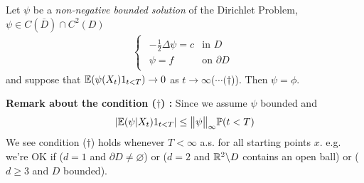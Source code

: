 \documentclass[12pt,a4paper]{report}
\begin{document}
 Let $\psi$ be a \emph{non-negative bounded solution} of the Dirichlet Problem, $\psi \in C(\overline{D}) \cap C^2(D)$
\begin{align*}
\begin{cases}
\begin{array}{ll}
-\frac{1}{2} \Delta \psi = c & \text{in } D \\
\psi = f & \text{on } \partial D
\end{array}
\end{cases}
\end{align*}
and suppose that $\mathbb{E}(\psi(X_t)1_{t<T}) \rightarrow 0$ as $t\rightarrow \infty$($\cdots (\dagger$)). Then $\psi = \phi$.

\textbf{Remark about the condition ($\dagger$) :} Since we assume $\psi$ bounded and
\begin{align*}
|\mathbb{E}(\psi | X_t) 1_{t<T}| \leq \bigl\lVert\psi\bigr\rVert_{\infty} \mathbb{P}(t< T)
\end{align*}
We see condition ($\dagger$) holds whenever $T< \infty$ a.s. for all starting points $x$. e.g. we're OK if ($d=1$ and $\partial D \neq \varnothing$) or ($d=2$ and $\mathbb{R}^2 \backslash D$ contains an open ball) or ($d\geq 3$ and $D$ bounded).
\end{document}
